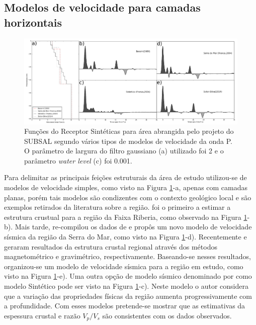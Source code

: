 \subsection{Modelos de velocidade para camadas horizontais}

\begin{figure}[!ht]
\centering
\includegraphics[scale=0.22]{Figs/modelagem_RF.png}
\caption{Funções do Receptor Sintéticas para área abrangida pelo projeto do SUBSAL segundo vários tipos de modelos de velocidade da onda P. O parâmetro de largura do filtro gaussiano (a) utilizado foi 2 e o parâmetro \textit{water level} (c) foi 0.001.}
\label{modelagem}
\end{figure}

Para delimitar as principais feições estruturais da área de estudo utilizou-se de modelos de velocidade simples, como visto na Figura \ref{modelagem}-a, apenas com camadas planas, porém tais modelos são condizentes com o contexto geológico local e são exemplos retirados da literatura sobre a região. \cite{Bassini_1986} foi o primeiro a estimar a estrutura crustual para a região da Faixa Riberia, como observado na Figura \ref{modelagem}-b). Mais tarde, \cite{sand_franca_crustal_2004} re-compilou os dados de \cite{Bassini_1986} e propôs um novo modelo de velocidade sísmica da região da Serra do Mar, como visto na Figura \ref{modelagem}-d). Recentemente \cite{flora_solon_ancient_2013} e \cite{Silva_2014} geraram resultados da estrutura crustal regional através dos métodos magnetométrico e gravimétrico, respectivamente. Baseando-se nesses resultados, organizou-se um modelo de velocidade sísmica para a região em estudo, como visto na Figura \ref{modelagem}-e). Uma outra opção de modelo sísmico denominado por \cite{sand_franca_crustal_2004} como modelo Sintético pode ser visto na Figura \ref{modelagem}-c). Neste modelo o autor considera que a variação das propriedades físicas da região aumenta progressivamente com a profundidade. Com esses modelos pretende-se mostrar que as estimativas da espessura crustal e razão $V_{p}/V_{s}$ são consistentes com os dados observados.

